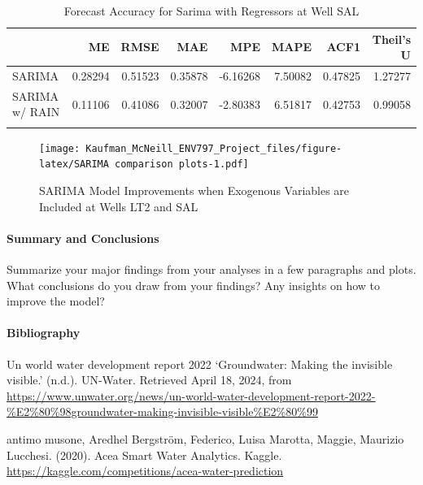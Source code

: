 \documentclass[
]{article}
\begin{document}
\begin{table}
\centering\centering
\caption{\label{tab:compare accuracy for all SARIMAs}Forecast Accuracy for Sarima with Regressors at Well SAL}
\centering
\begin{tabular}[t]{l|r|r|r|r|r|r|r}
\hline
  & ME & RMSE & MAE & MPE & MAPE & ACF1 & Theil's U\\
\hline
SARIMA & 0.28294 & 0.51523 & 0.35878 & -6.16268 & 7.50082 & 0.47825 & 1.27277\\
\hline
SARIMA w/ RAIN & 0.11106 & 0.41086 & 0.32007 & -2.80383 & 6.51817 & 0.42753 & 0.99058\\
\hline
\cellcolor{gray!10}{SARIMA w/ TEMP} & \cellcolor{gray!10}{-0.03167} & \cellcolor{gray!10}{0.35584} & \cellcolor{gray!10}{0.28774} & \cellcolor{gray!10}{0.03923} & \cellcolor{gray!10}{5.75457} & \cellcolor{gray!10}{0.32779} & \cellcolor{gray!10}{0.84574}\\
\hline
\end{tabular}
\end{table}

\begin{figure}
\centering
\texttt{[image: Kaufman\_McNeill\_ENV797\_Project\_files/figure-latex/SARIMA comparison plots-1.pdf]}
\caption{SARIMA Model Improvements when Exogenous Variables are Included
at Wells LT2 and SAL}
\end{figure}

\hypertarget{summary-and-conclusions}{%
\paragraph{Summary and Conclusions}\label{summary-and-conclusions}}

Summarize your major findings from your analyses in a few paragraphs and
plots. What conclusions do you draw from your findings? Any insights on
how to improve the model?

\hypertarget{bibliography}{%
\paragraph{Bibliography}\label{bibliography}}

Un world water development report 2022 `Groundwater: Making the
invisible visible.' (n.d.). UN-Water. Retrieved April 18, 2024, from
\url{https://www.unwater.org/news/un-world-water-development-report-2022-\%E2\%80\%98groundwater-making-invisible-visible\%E2\%80\%99}

antimo musone, Aredhel Bergström, Federico, Luisa Marotta, Maggie,
Maurizio Lucchesi. (2020). Acea Smart Water Analytics. Kaggle.
\url{https://kaggle.com/competitions/acea-water-prediction}
\end{document}
